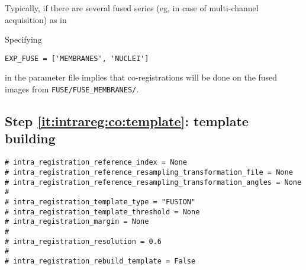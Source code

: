 Typically, if there are several fused series (eg, in case of multi-channel
acquisition) as in

\mbox{}
\mbox{}

Specifying
\begin{verbatim}
EXP_FUSE = ['MEMBRANES', 'NUCLEI']
\end{verbatim}
in the parameter file implies that co-registrations will be done on
the fused images from \texttt{FUSE/FUSE\_MEMBRANES/}.



\subsection{Step \ref{it:intrareg:co:template}: template building}
\label{sec:cli:intraregistration:template}

\begin{verbatim}
# intra_registration_reference_index = None
# intra_registration_reference_resampling_transformation_file = None
# intra_registration_reference_resampling_transformation_angles = None
#
# intra_registration_template_type = "FUSION"
# intra_registration_template_threshold = None
# intra_registration_margin = None
#
# intra_registration_resolution = 0.6
#
# intra_registration_rebuild_template = False
\end{verbatim}

